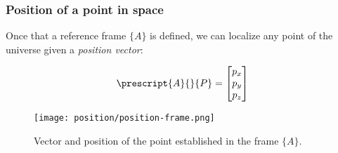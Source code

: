 \subsubsection{Position of a point in space}
Once that a reference frame $\{A\}$ is defined, we can localize any point of the universe given a \emph{position vector}:
\begin{figure}[H]
    \centering

    \begin{minipage}{0.4\textwidth}
        \begin{equation*}
            \prescript{A}{}{P} = \begin{bmatrix}
                p_x \\ p_y \\ p_z
            \end{bmatrix}
        \end{equation*}
    \end{minipage}
    \begin{minipage}{0.4\textwidth}
        \centering
        \texttt{[image: position/position-frame.png]}
    \end{minipage}
    \caption{Vector and position of the point established in the frame $\{A\}$.}
\end{figure}


